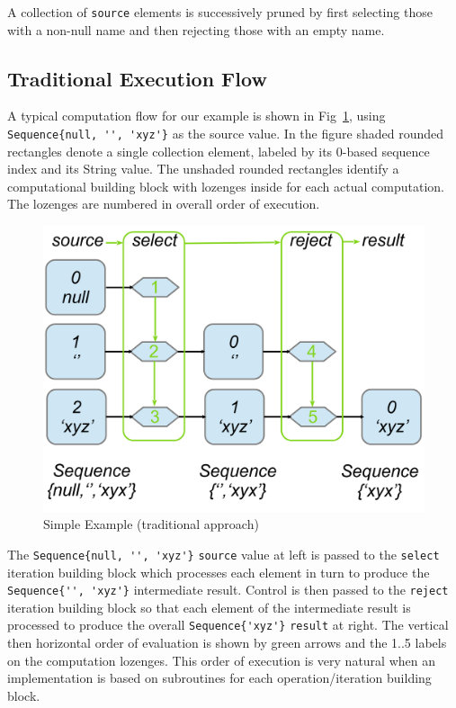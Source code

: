 \documentclass[
]{ceurart}
\begin{document}
A collection of \verb!source! elements is successively pruned by first selecting those with a non-null name and then rejecting those with an empty name.

\subsection{Traditional Execution Flow}

A typical computation flow for our example is shown in Fig~\ref{fig:ExampleStandard}, using \verb!Sequence{null, '', 'xyz'}! as the source value. In the figure shaded rounded rectangles denote a single collection element, labeled by its 0-based sequence index and its String value. The unshaded rounded rectangles identify a computational building block with lozenges inside for each actual computation. The lozenges are numbered in overall order of execution.

\begin{figure}
	\vspace{-10pt}
	\begin{center}
		\includegraphics[width=5.0in]{ExampleStandard.png}
	\end{center}
	\vspace{-10pt}
	\caption{Simple Example (traditional approach)}
	\label{fig:ExampleStandard}
	\vspace{-10pt}
\end{figure}

The \verb!Sequence{null, '', 'xyz'}! \verb!source! value at left is passed to the \verb!select! iteration building block which processes each element in turn to produce the \verb!Sequence{'', 'xyz'}! intermediate result.  Control is then passed to the \verb!reject! iteration building block so that each element of the intermediate result is processed to produce the overall  \verb!Sequence{'xyz'}! \verb!result! at right. The vertical then horizontal order of evaluation is shown by green arrows and the 1..5 labels on the computation lozenges. This order of execution is very natural when an implementation is based on subroutines for each operation/iteration building block.
\end{document}
